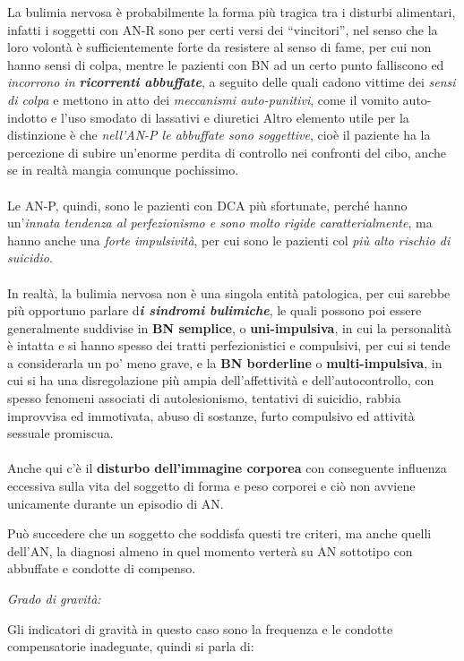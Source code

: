 La bulimia nervosa è probabilmente la forma più tragica tra i disturbi
alimentari, infatti i soggetti con AN-R sono per certi versi dei
``vincitori'', nel senso che la loro volontà è sufficientemente forte da
resistere al senso di fame, per cui non hanno sensi di colpa, mentre le
pazienti con BN ad un certo punto falliscono ed \emph{incorrono in
\textbf{ricorrenti abbuffate}}, a seguito delle quali cadono vittime dei
\emph{sensi di colpa} e mettono in atto dei \emph{meccanismi
auto-punitivi}, come il vomito auto-indotto e l'uso smodato di lassativi
e diuretici Altro elemento utile per la distinzione è che
\emph{nell'AN-P le abbuffate sono soggettive}, cioè il paziente ha la
percezione di subire un'enorme perdita di controllo nei confronti del
cibo, anche se in realtà mangia comunque pochissimo.
\\\\
Le AN-P, quindi, sono le pazienti con DCA più sfortunate, perché hanno
un'\emph{innata tendenza al perfezionismo e sono molto rigide
caratterialmente}, ma hanno anche una \emph{forte impulsività}, per cui
sono le pazienti col \emph{più alto rischio di suicidio}.
\\\\
In realtà, la bulimia nervosa non è una singola entità patologica, per
cui sarebbe più opportuno parlare d\textbf{\emph{i sindromi bulimiche}},
le quali possono poi essere generalmente suddivise in \textbf{BN
semplice}, o \textbf{uni-impulsiva}, in cui la personalità è intatta e
si hanno spesso dei tratti perfezionistici e compulsivi, per cui si
tende a considerarla un po' meno grave, e la \textbf{BN borderline} o
\textbf{multi-impulsiva}, in cui si ha una disregolazione più ampia
dell'affettività e dell'autocontrollo, con spesso fenomeni associati di
autolesionismo, tentativi di suicidio, rabbia improvvisa ed immotivata,
abuso di sostanze, furto compulsivo ed attività sessuale promiscua.
\\\\
Anche qui c'è il \textbf{disturbo dell'immagine corporea} con
conseguente influenza eccessiva sulla vita del soggetto di forma e peso
corporei e ciò non avviene unicamente durante un episodio di AN.

Può succedere che un soggetto che soddisfa questi tre criteri, ma anche
quelli dell'AN, la diagnosi almeno in quel momento verterà su AN
sottotipo con abbuffate e condotte di compenso.

\emph{\emph{Grado di gravità:}}

Gli indicatori di gravità in questo caso sono la frequenza e le condotte
compensatorie inadeguate, quindi si parla di:

